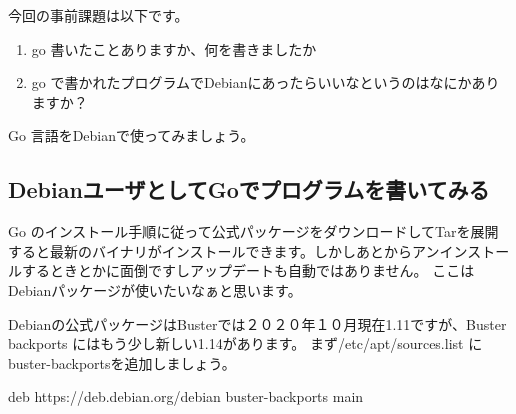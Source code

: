 \documentclass[mingoth,a4paper]{jsarticle}
\begin{document}


今回の事前課題は以下です。

\begin{enumerate}
 \item go 書いたことありますか、何を書きましたか
 \item go で書かれたプログラムでDebianにあったらいいなというのはなにかありますか？
\end{enumerate}


\begin{multicols}{2}
{\small
% 
}
\end{multicols}

%
%
%
%




Go 言語をDebianで使ってみましょう。

\subsection{DebianユーザとしてGoでプログラムを書いてみる}

Go のインストール手順\cite{golangorg-install}に従って公式パッケージをダウンロードしてTarを展開すると最新のバイナリがインストールできます。しかしあとからアンインストールするときとかに面倒ですしアップデートも自動ではありません。
ここはDebianパッケージが使いたいなぁと思います。

Debianの公式パッケージはBusterでは２０２０年１０月現在1.11ですが、Buster backports にはもう少し新しい1.14があります。
まず/etc/apt/sources.list に buster-backportsを追加しましょう。

\begin{commandline}
deb https://deb.debian.org/debian buster-backports main
\end{commandline}
\end{document}
